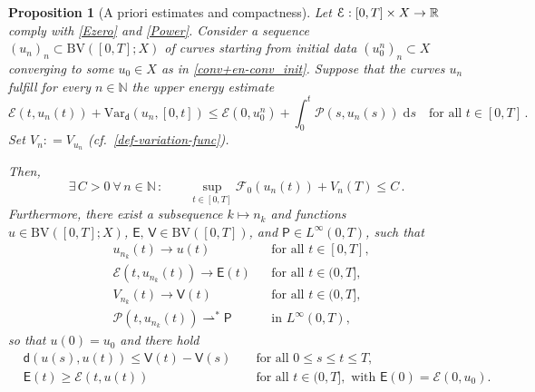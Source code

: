 \documentclass[a4paper,10pt,reqno]{amsart} %
\newcommand{\R}{\mathbb{R}}
\newcommand{\N}{\mathbb{N}}
\newtheorem{proposition}[theorem]{Proposition}
\numberwithin{equation}{section}
\newcommand{\weaksto}{\rightharpoonup^*}
\def\dd{\;\!\mathrm{d}} %
\newcommand{\Xs}{X}
\newcommand{\BV}{\mathrm{BV}}
\newcommand{\mdn}{\mathsf{d}}
\newcommand{\md}[2]{\mathsf{d}(#1,#2)}
\newcommand{\ene}[2]{\mathcal{E}(#1,#2)}
\newcommand{\perto}[1]{\mathcal{F}_0(#1)}
\newcommand{\pw}[2]{\mathcal{P}(#1,#2)}
\newcommand{\Vari}[4]{\mathrm{Var}_{#1}(#2,[#3,#4])}
\newcommand{\Vf}[2]{V_{#1}(#2)}
\newcommand{\limE}{\mathsf{E}}
\newcommand{\limV}{\mathsf{V}}
\newcommand{\limP}{\mathsf{P}}
\begin{document}
\begin{proposition}[A priori estimates and compactness]
\label{prop:compactness}
  Let $\calE: [0,T]\times \Xs \to \R$ comply with  \eqref{Ezero} and  \eqref{Power}. Consider a sequence $(u_n)_n\subset \BV([0,T];\Xs)$ of curves starting from initial data $(u_0^n)_n\subset \Xs$ converging to some $u_0\in \Xs$ as in   \eqref{conv+en-conv_init}.
Suppose that the curves $u_n$ fulfill for every $n\in \N$ the upper energy estimate
\begin{equation}
\label{uee-n}
\ene t{u_n(t)} + \Vari {\mdn}{u_n}0{t} \leq \ene 0{u_0^n} +\int_0^t \pw s{u_n(s)} \dd s \quad \text{for all } t \in [0,T]\,.
\end{equation}
Set $V_n: =  V_{u_n}$  (cf.\ \eqref{def-variation-func}).  
\par
Then, 
\begin{equation}
\label{energy-variation-bound}
\exists\, C>0 \ \forall\, n \in \N\, : \qquad \sup_{t\in [0,T]}\perto{u_n(t)} + V_n(T) \leq C\,.
\end{equation}
Furthermore, 
there exist a subsequence $k\mapsto n_k$ and functions $u\in  \BV([0,T];\Xs)$, $\limE,\, \limV\in \BV([0,T])$, and $\limP\in L^\infty(0,T)$, such that
\begin{subequations} 
\label{convs}
\begin{align}
&
\label{convs-a}
u_{n_k}(t) \to u(t) && \text{for all } t \in [0,T],
\\
& 
\label{convs-b}
\ene t{u_{n_k}(t)} \to \limE(t) && \text{for all } t \in (0,T],
\\
& 
\label{convs-c}
V_{n_k}(t) \to \limV(t) && \text{for all } t \in (0,T],
\\
& 
\label{convs-d}
\pw t{u_{n_k}(t)} \weaksto \limP && \text{in }L^\infty(0,T),
\end{align}
\end{subequations}
so that $u(0)=u_0$ and 
there hold
\begin{subequations}
\label{props-lim}
\begin{align}
\label{bv-EST}
&
\md {u(s)}{u(t)} \leq \limV(t) - \limV(s) &&  \text{ for all } 0\leq s\leq t \leq T,
\\
& 
\label{en-EST}
\limE(t) \geq \ene t{u(t)} && \text{ for all } t\in (0,T], \text{ with } \limE(0)= \ene0{u_0}.

\end{align}
\end{subequations}
\end{proposition}
\end{document}
